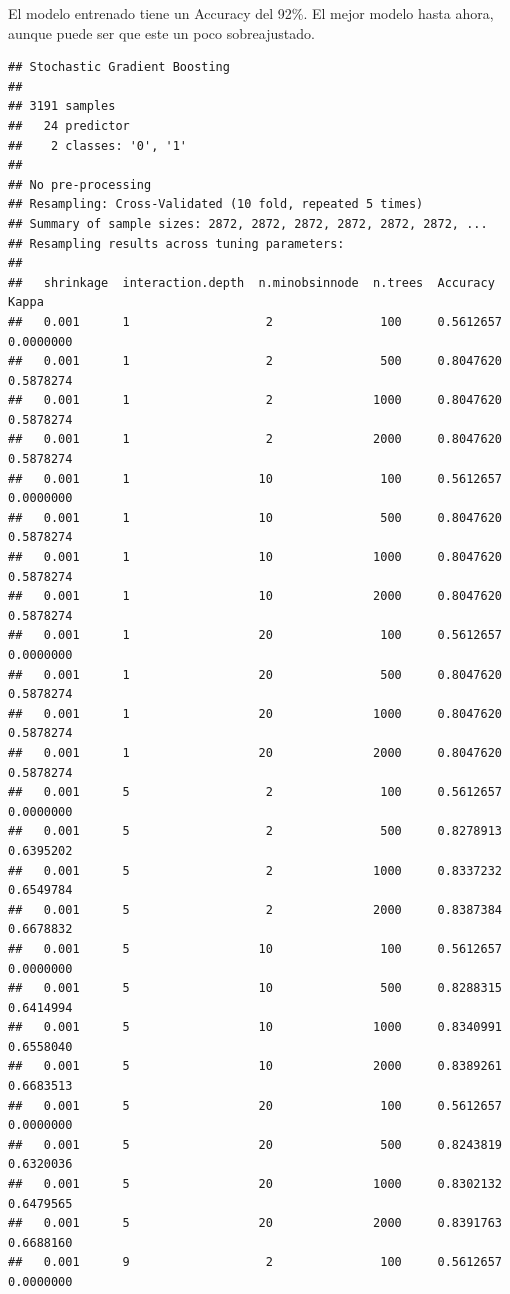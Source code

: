 \documentclass[]{article}
\begin{document}
El modelo entrenado tiene un Accuracy del 92\%. El mejor modelo hasta
ahora, aunque puede ser que este un poco sobreajustado.

\begin{lstlisting}
## Stochastic Gradient Boosting 
## 
## 3191 samples
##   24 predictor
##    2 classes: '0', '1' 
## 
## No pre-processing
## Resampling: Cross-Validated (10 fold, repeated 5 times) 
## Summary of sample sizes: 2872, 2872, 2872, 2872, 2872, 2872, ... 
## Resampling results across tuning parameters:
## 
##   shrinkage  interaction.depth  n.minobsinnode  n.trees  Accuracy   Kappa    
##   0.001      1                   2               100     0.5612657  0.0000000
##   0.001      1                   2               500     0.8047620  0.5878274
##   0.001      1                   2              1000     0.8047620  0.5878274
##   0.001      1                   2              2000     0.8047620  0.5878274
##   0.001      1                  10               100     0.5612657  0.0000000
##   0.001      1                  10               500     0.8047620  0.5878274
##   0.001      1                  10              1000     0.8047620  0.5878274
##   0.001      1                  10              2000     0.8047620  0.5878274
##   0.001      1                  20               100     0.5612657  0.0000000
##   0.001      1                  20               500     0.8047620  0.5878274
##   0.001      1                  20              1000     0.8047620  0.5878274
##   0.001      1                  20              2000     0.8047620  0.5878274
##   0.001      5                   2               100     0.5612657  0.0000000
##   0.001      5                   2               500     0.8278913  0.6395202
##   0.001      5                   2              1000     0.8337232  0.6549784
##   0.001      5                   2              2000     0.8387384  0.6678832
##   0.001      5                  10               100     0.5612657  0.0000000
##   0.001      5                  10               500     0.8288315  0.6414994
##   0.001      5                  10              1000     0.8340991  0.6558040
##   0.001      5                  10              2000     0.8389261  0.6683513
##   0.001      5                  20               100     0.5612657  0.0000000
##   0.001      5                  20               500     0.8243819  0.6320036
##   0.001      5                  20              1000     0.8302132  0.6479565
##   0.001      5                  20              2000     0.8391763  0.6688160
##   0.001      9                   2               100     0.5612657  0.0000000

\end{lstlisting}
\end{document}
